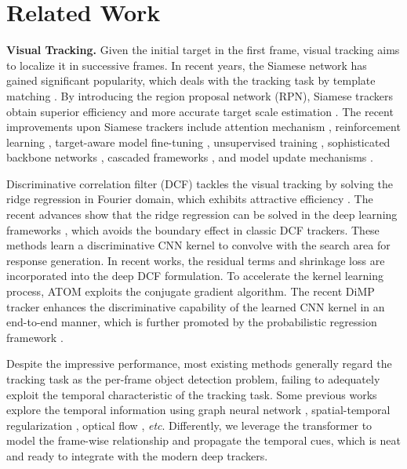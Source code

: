 \documentclass[10pt,twocolumn,letterpaper]{article}
\begin{document}
\section{Related Work}
{\noindent \bf Visual Tracking.} Given the initial target in the first frame, visual tracking aims to localize it in successive frames.
In recent years, the Siamese network has gained significant popularity, which deals with the tracking task by template matching \cite{SiamFC,SINT,GOTURN}. 
By introducing the region proposal network (RPN), Siamese trackers obtain superior efficiency and more accurate target scale estimation \cite{SiamRPN,DaSiamRPN}.
The recent improvements upon Siamese trackers include attention mechanism \cite{RASNet}, reinforcement learning \cite{EAST,POST}, target-aware model fine-tuning \cite{TADT}, unsupervised training \cite{UDT,LUDT}, sophisticated backbone networks \cite{siamrpn++,deeperwiderSiamFC}, cascaded frameworks \cite{CRPN,SPM}, and model update mechanisms \cite{GCT,Dsiam,MemTrack,SiameseUpdate}.




Discriminative correlation filter (DCF) tackles the visual tracking by solving the ridge regression in Fourier domain, which exhibits attractive efficiency \cite{KCF,HCF,CSR-DCF,BACF,Context-AwareCorrelationFilter,MCCT,C-COT,ECO}. 
The recent advances show that the ridge regression can be solved in the deep learning frameworks \cite{CREST,DSLT,ATOM,DiMP}, which avoids the boundary effect in classic DCF trackers.
These methods learn a discriminative CNN kernel to convolve with the search area for response generation.
In recent works, the residual terms \cite{CREST} and shrinkage loss \cite{DSLT} are incorporated into the deep DCF formulation.  
To accelerate the kernel learning process, ATOM \cite{ATOM} exploits the conjugate gradient algorithm. 
The recent DiMP tracker \cite{DiMP} enhances the discriminative capability of the learned CNN kernel in an end-to-end manner, which is further promoted by the probabilistic regression framework \cite{PrDiMP}.




Despite the impressive performance, most existing methods \cite{MDNet,SiamFC,SiamRPN,ATOM,DiMP,D3S,MAML} generally regard the tracking task as the per-frame object detection problem, failing to adequately exploit the temporal characteristic of the tracking task.
Some previous works explore the temporal information using graph neural network \cite{GCT}, spatial-temporal regularization \cite{STRCF}, optical flow \cite{FlowCF}, \emph{etc}. 
Differently, we leverage the transformer to model the frame-wise relationship and propagate the temporal cues, which is neat and ready to integrate with the modern deep trackers.
\end{document}
